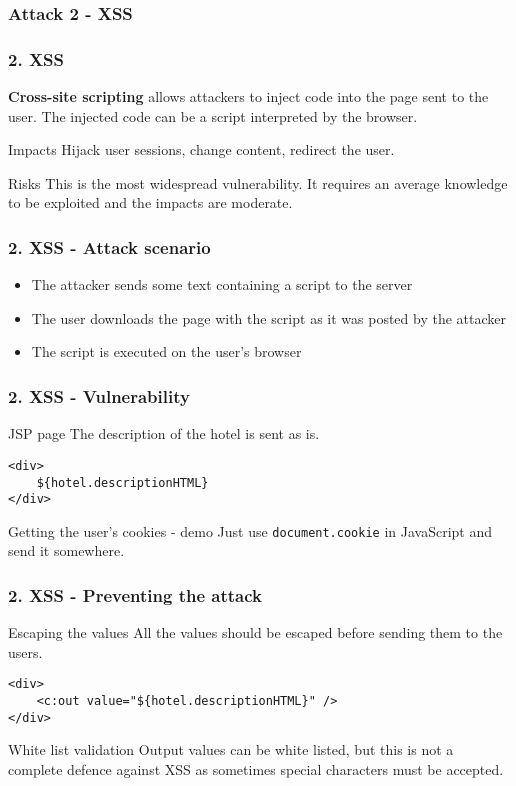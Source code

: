 \subsubsection{Attack 2 - XSS}

\begin{frame}
\frametitle{2. XSS}
\textbf{Cross-site scripting} allows attackers to inject code into the page
sent to the user. The injected code can be a script interpreted by the
browser.
\begin{block}{Impacts}
Hijack user sessions, change content, redirect the user.
\end{block}
\begin{block}{Risks}
This is \alert{the most widespread} vulnerability.
It requires an average knowledge to be exploited and the impacts are moderate.
\end{block}
\end{frame}

\begin{frame}
\frametitle{2. XSS - Attack scenario}
\begin{itemize}
\item The attacker sends some text containing a script to the server
\item The user downloads the page with the script as it was posted by the
	attacker
\item The script is executed on the user's browser
\end{itemize}
\end{frame}

\begin{frame}[fragile]
\frametitle{2. XSS - Vulnerability}
\begin{exampleblock}{JSP page}
The description of the hotel is sent as is.
\begin{lstlisting}
<div>
	${hotel.descriptionHTML}
</div>
\end{lstlisting}
\end{exampleblock}
\pause
\begin{exampleblock}{Getting the user's cookies - demo}
Just use \lstinline!document.cookie! in JavaScript and send it somewhere.
\end{exampleblock}
\end{frame}

\begin{frame}[fragile]
\frametitle{2. XSS - Preventing the attack}
\begin{block}{Escaping the values}
All the values should be escaped before sending them to the users.
\begin{lstlisting}
<div>
	<c:out value="${hotel.descriptionHTML}" />
</div>
\end{lstlisting}
\end{block}
\begin{block}{White list validation}
Output values can be white listed, but this is not a complete defence against
XSS as sometimes special characters must be accepted.
\end{block}
\end{frame}

